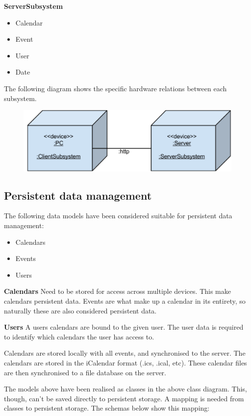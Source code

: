 \documentclass[10pt]{report}
\numberwithin{equation}{section} %
\numberwithin{figure}{section} %
\numberwithin{table}{section} %
\begin{document}
\textbf{ServerSubsystem}
\begin{itemize}
\item Calendar
\item Event
\item User
\item Date
\end{itemize}

The following diagram shows the specific hardware relations between each
subsystem.
\begin{figure}[H]
  \includegraphics[scale=0.7]{figures/components.png}
\end{figure}

\subsection{Persistent data management}
The following data models have been considered suitable for persistent data
management:
\begin{itemize}
\item Calendars
\item Events
\item Users
\end{itemize}

\textbf{Calendars}  Need to be stored for access across multiple devices. This make
calendars persistent data. Events are what make up a calendar in its entirety,
so naturally these are also considered persistent data.


\textbf{Users} A users calendars are bound to the given user. The user data is required
to identify which calendars the user has access to.


Calendars are stored locally with all events, and synchronised to the
server. The calendars are stored in the iCalendar format (.ics, .ical,
etc). These calendar files are then synchronised to a file database on the
server.


The models above have been realised as classes in the above class diagram. This, though, can't be saved directly to persistent storage. A mapping is needed from classes to persistent storage. The schemas below show this mapping:
\end{document}
